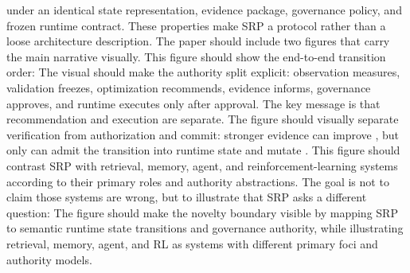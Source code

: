 {}\markdownRendererInterblockSeparator
{}under an identical state representation, evidence package, governance policy, and frozen runtime contract.\markdownRendererParagraphSeparator
{}These properties make SRP a protocol rather than a loose architecture description.\markdownRendererInterblockSeparator
{}
\markdownRendererSectionEnd \markdownRendererSectionBegin
{}\markdownRendererInterblockSeparator
{}The paper should include two figures that carry the main narrative visually.\markdownRendererParagraphSeparator
{} This figure should show the end-to-end transition order:\markdownRendererInterblockSeparator
{}\markdownRendererInterblockSeparator
{}The visual should make the authority split explicit: observation measures, validation freezes, optimization recommends, evidence informs, governance approves, and runtime executes only after approval. The key message is that recommendation and execution are separate.\markdownRendererInterblockSeparator
{}\markdownRendererInterblockSeparator
{}The figure should visually separate verification from authorization and commit: stronger evidence can improve , but only  can admit the transition into runtime state and mutate .\markdownRendererParagraphSeparator
{} This figure should contrast SRP with retrieval, memory, agent, and reinforcement-learning systems according to their primary roles and authority abstractions. The goal is not to claim those systems are wrong, but to illustrate that SRP asks a different question:\markdownRendererInterblockSeparator
{}\markdownRendererInterblockSeparator
{}The figure should make the novelty boundary visible by mapping SRP to semantic runtime state transitions and governance authority, while illustrating retrieval, memory, agent, and RL as systems with different primary foci and authority models.\markdownRendererInterblockSeparator

